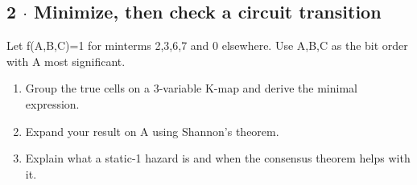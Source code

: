 \documentclass[11pt]{article}
\begin{document}
\begin{keepsection}
\begin{keepsection}
\subsection{2 \ensuremath{\cdot} Minimize, then check a circuit transition}

Let f(A,B,C)=1 for minterms 2,3,6,7 and 0 elsewhere. Use A,B,C as the bit order with A most significant.

\begin{enumerate}
\item Group the true cells on a 3-variable K-map and derive the minimal expression.
\item Expand your result on A using Shannon’s theorem.
\item Explain what a static-1 hazard is and when the consensus theorem helps with it.
\end{enumerate}

\end{keepsection}
\end{keepsection}
\end{document}

